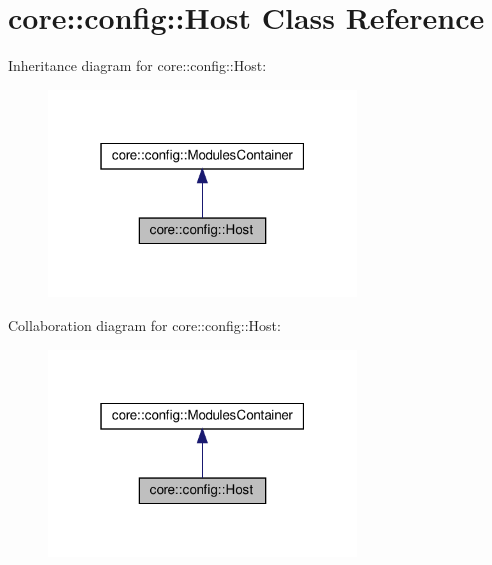 \hypertarget{classcore_1_1config_1_1Host}{}\section{core\+:\+:config\+:\+:Host Class Reference}
\label{classcore_1_1config_1_1Host}


Inheritance diagram for core\+:\+:config\+:\+:Host\+:
\nopagebreak
\begin{figure}[H]
\begin{center}
\leavevmode
\includegraphics[width=232pt]{classcore_1_1config_1_1Host__inherit__graph}
\end{center}
\end{figure}


Collaboration diagram for core\+:\+:config\+:\+:Host\+:
\nopagebreak
\begin{figure}[H]
\begin{center}
\leavevmode
\includegraphics[width=232pt]{classcore_1_1config_1_1Host__coll__graph}
\end{center}
\end{figure}
